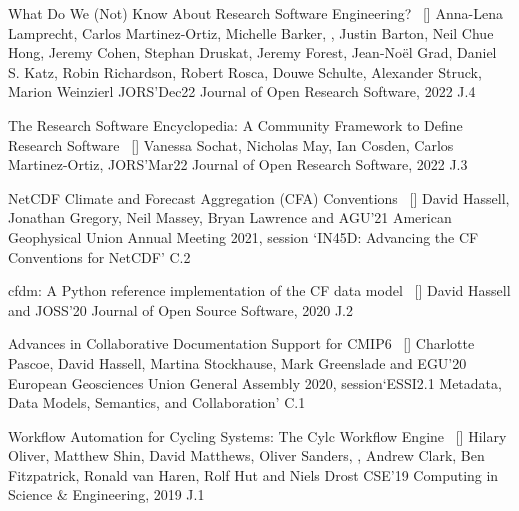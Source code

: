 \begin{publications}

\publication
	{What Do We (Not) Know About Research Software Engineering?}{~ [\href{https://openresearchsoftware.metajnl.com/articles/10.5334/jors.384}{\small{\linkSymbol}}]}
	{Anna-Lena Lamprecht, Carlos Martinez-Ortiz, Michelle Barker, \underline{}, Justin Barton, Neil Chue Hong, Jeremy Cohen, Stephan Druskat, Jeremy Forest, Jean-Noël Grad, Daniel S. Katz, Robin Richardson, Robert Rosca, Douwe Schulte, Alexander Struck, Marion Weinzierl}
	{JORS'Dec22} {Journal of Open Research Software, 2022} {J.4}

\publication
	{The Research Software Encyclopedia: A Community Framework to Define Research Software}{~ [\href{https://openresearchsoftware.metajnl.com/articles/10.5334/jors.359}{\small{\linkSymbol}}]}
	{Vanessa Sochat, Nicholas May, Ian Cosden, Carlos Martinez-Ortiz, \underline{}}
	{JORS'Mar22} {Journal of Open Research Software, 2022} {J.3}

\publication
	{NetCDF Climate and Forecast Aggregation (CFA) Conventions}{~ [\href{https://ui.adsabs.harvard.edu/abs/2021AGUFMIN45D0483H}{\small{\linkSymbol}}]}
	{David Hassell, Jonathan Gregory, Neil Massey, Bryan Lawrence and \underline{}}
	{AGU'21} {American Geophysical Union Annual Meeting 2021, session `IN45D: Advancing the CF Conventions for NetCDF'} {C.2}

\publication
	{cfdm: A Python reference implementation of the CF data model}{~ [\href{https://joss.theoj.org/papers/10.21105/joss.02717}{\small{\linkSymbol}}]}
	{David Hassell and \underline{}}
	{JOSS'20} {Journal of Open Source Software, 2020} {J.2}

\publication
	{Advances in Collaborative Documentation Support for CMIP6}{~ [\href{https://zenodo.org/records/3928319}{\small{\linkSymbol}}]}
	{Charlotte Pascoe, David Hassell, Martina Stockhause, Mark Greenslade and \underline{}}
	{EGU'20} {European Geosciences Union General Assembly 2020, session\newline `ESSI2.1
Metadata, Data Models, Semantics, and Collaboration'} {C.1}

\publication
	{Workflow Automation for Cycling Systems: The Cylc Workflow Engine}{~ [\href{https://ieeexplore.ieee.org/document/8675433}{\small{\linkSymbol}}]}
	{Hilary Oliver, Matthew Shin, David Matthews, Oliver Sanders, \underline{}, Andrew Clark, Ben Fitzpatrick, Ronald van Haren, Rolf Hut and Niels Drost}
	{CSE'19} {Computing in Science \& Engineering, 2019} {J.1}



\end{publications}

\vspace{-3mm}
